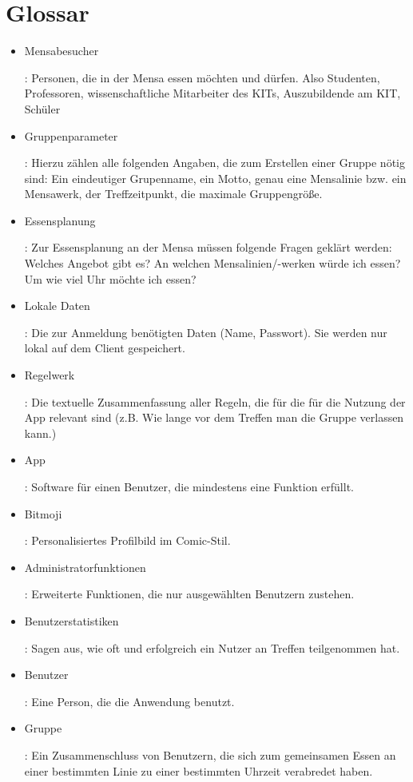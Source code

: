 \documentclass[a4paper]{scrreprt}
\begin{document}
\chapter{Glossar}
 \begin{itemize}
 \item \hypertarget{label1}{Mensabesucher}: Personen, die in der Mensa essen möchten und dürfen. Also Studenten, Professoren, wissenschaftliche Mitarbeiter des KITs, Auszubildende am KIT, Schüler
 \item \hypertarget{label2}{Gruppenparameter}: Hierzu zählen alle folgenden Angaben, die zum Erstellen einer Gruppe nötig sind: Ein eindeutiger Grupenname, ein Motto, genau eine Mensalinie bzw. ein Mensawerk, der Treffzeitpunkt, die maximale Gruppengröße.
\item \hypertarget{label3}{Essensplanung}: Zur Essensplanung an der Mensa müssen folgende Fragen geklärt werden: Welches Angebot gibt es? An welchen Mensalinien/-werken würde ich essen? Um wie viel Uhr möchte ich essen?
\item \hypertarget{label4}{Lokale Daten}: Die zur Anmeldung benötigten Daten (Name, Passwort). Sie werden nur lokal auf dem Client gespeichert.
\item \hypertarget{label5}{Regelwerk}: Die textuelle Zusammenfassung aller Regeln, die für die für die Nutzung der App relevant sind (z.B. Wie lange vor dem Treffen man die Gruppe verlassen kann.)
\item \hypertarget{label6}{App}: Software für einen Benutzer, die mindestens eine Funktion erfüllt.
\item \hypertarget{label7}{Bitmoji}: Personalisiertes Profilbild im Comic-Stil.
\item \hypertarget{label8}{Administratorfunktionen}: Erweiterte Funktionen, die nur ausgewählten Benutzern zustehen.
\item \hypertarget{label9}{Benutzerstatistiken}: Sagen aus, wie oft und erfolgreich ein Nutzer an Treffen teilgenommen hat.
\item \hypertarget{benutzer}{Benutzer}: Eine Person, die die Anwendung benutzt.
\item \hypertarget{gruppe}{Gruppe}: Ein Zusammenschluss von Benutzern, die sich zum gemeinsamen Essen an einer bestimmten Linie zu einer bestimmten Uhrzeit verabredet haben.

 \end{itemize}
\end{document}
